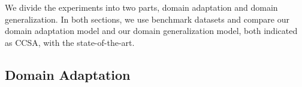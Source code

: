 We divide the experiments into two parts, domain adaptation and domain generalization. In both sections, we use
benchmark datasets and compare our domain adaptation
model and our domain generalization model, both indicated
as CCSA, with the state-of-the-art.


\subsection{Domain Adaptation}



\begin{table}[t]
\caption{\textbf{VLCS dataset.} Classification accuracy for domain generalization over the 5 categories of the VLCS dataset. {\tt LB} (Lower Bound) is our base model trained without the contrastive semantic alignment loss. {\tt 1NN} stands for first nearest neighbor. }
\label{tab-VLCS}
\centering
{}
\end{table}



